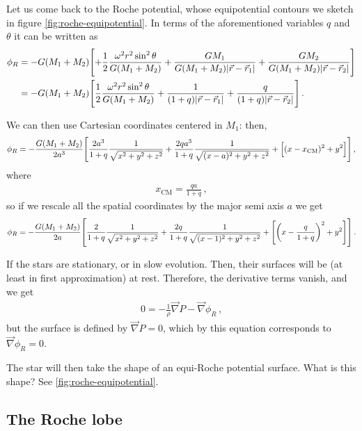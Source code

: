 \documentclass[main.tex]{subfiles}
\begin{document}
Let us come back to the Roche potential, whose equipotential contours we sketch in figure \ref{fig:roche-equipotential}. 
In terms of the aforementioned variables \(q\) and \(\theta \) it can be written as
%
\begin{align}
\phi _R &=  
- G (M_1 + M_2 ) \qty[ + \frac{1}{2} \frac{\omega^2 r^2 \sin^2\theta }{G (M_1 + M_2 )}
+ \frac{GM_1 }{G (M_1 + M_2 ) \abs{\vec{r} - \vec{r}_1 }}
+ \frac{GM_2 }{G (M_1 + M_2 ) \abs{\vec{r} - \vec{r}_2 }}
 ]  \\
 &= - G (M_1 + M_2 )
 \qty[
     \frac{1}{2} \frac{\omega^2r^2 \sin^2\theta }{G(M_1 + M_2 )} 
     + \frac{1}{(1 + q) \abs{\vec{r} - \vec{r}_1}}
     + \frac{q}{(1 + q) \abs{\vec{r} - \vec{r}_2}}
 ]
\,.
\end{align}

We can then use Cartesian coordinates centered in \(M_1 \): 
then, 
%
\begin{align}
\phi _R = - \frac{G (M_1 + M_2  )}{2 a^3}
\qty[ \frac{2 a^3}{1 + q}
\frac{1}{\sqrt{x^2 +y^2 +z^2}}
+
\frac{2 q a^3}{1 + q} 
\frac{1}{\sqrt{(x-a)^2 + y^2 +z^2}}
+ \qty[(x - x _{\text{CM}})^2 + y^2]
]
\,,
\end{align}
%
where 
%
\begin{align}
x _{\text{CM}} = \frac{qa}{1 + q}
\,,
\end{align}
%
so if we rescale all the spatial coordinates by the major semi axis \(a\) we get 
%
\begin{align}
\phi _R = - \frac{G (M_1 + M_2 )}{2a}
\qty[
\frac{2}{1 +q}
\frac{1}{\sqrt{x^2 +y^2 +z^2}} 
+
\frac{2 q}{1 + q} 
\frac{1}{\sqrt{(x-1)^2 + y^2 + z^2}}
+ \qty[\qty(x - \frac{q}{1 + q})^2 + y^2]
]
\,.
\end{align}

If the stars are stationary, or in slow evolution. Then, their surfaces will be (at least in first approximation) at rest. Therefore, the derivative terms vanish, and we get 
%
\begin{align}
0  = - \frac{1}{\rho } \vec{\nabla} P - \vec{\nabla} \phi _R
\,,
\end{align}
%
but the surface is defined by \(\vec{\nabla} P = 0\), which by this equation corresponds to \(\vec{\nabla} \phi _R = 0\). 

The star will then take the shape of an equi-Roche potential surface. 
What is this shape? See \ref{fig:roche-equipotential}.


\subsection{The Roche lobe}
\end{document}
